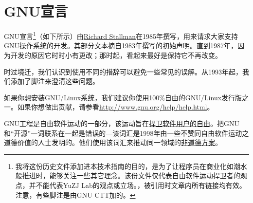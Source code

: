 \chapter{GNU宣言}
GNU宣言\footnote{我将这份历史文件添加进本技术指南的目的，是为了让程序员在商业化如潮水般推进时，能够关注一些其它理念。该份文件仅代表自由软件运动捍卫者的观点，并不能代表YuZJ Lab的观点或立场。\cite{gnum}，被引用时文章内所有链接均有效。注意，有些脚注是由GNU CTT加的。}（如下所示）由\href{http://www.stallman.org/}{Richard Stallman}在1985年撰写，用来请求大家支持GNU操作系统的开发。其部分文本摘自1983年撰写的初始声明。直到1987年，因为开发的原因它时时小有更改；那时起，看起来最好是保持它不再改变。\par
时过境迁，我们认识到使用不同的措辞可以避免一些常见的误解。从1993年起，我们添加了脚注来澄清这些问题。\par
如果你想安装GNU/Linux系统，我们建议你使用\href{http://www.gnu.org/distros}{100\%自由的GNU/Linux发行版}之一。如果你想做出贡献，请参看\url{http://www.gnu.org/help/help.html}。\par
GNU工程是自由软件运动的一部分，该运动旨在\href{http://www.gnu.org/philosophy/free-sw.html}{捍卫软件用户的自由}。把GNU和“开源”一词联系在一起是错误的—该词汇是1998年由一些不赞同自由软件运动之道德价值的人士发明的。他们使用该词汇来推动同一领域的\href{http://www.gnu.org/philosophy/open-source-misses-the-point.html}{非道德方案}。\par
